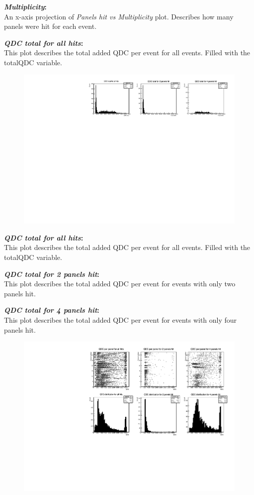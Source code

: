 \documentclass[a4paper,12pt]{article}
\begin{document}
\textbf{\emph{Multiplicity}:} \\
An x-axis projection of \emph{Panels hit vs Multiplicity} plot. Describes how many panels were hit for each event.

\textbf{\emph{QDC total for all hits}:} \\
This plot describes the total added QDC per event for all events. Filled with the totalQDC variable.

\pagebreak
\begin{figure}[h]
\centering
\includegraphics[scale=0.8]{QDCtotal.pdf}
\end{figure}

\textbf{\emph{QDC total for all hits}:} \\
This plot describes the total added QDC per event for all events. Filled with the totalQDC variable.

\textbf{\emph{QDC total for 2 panels hit}:} \\
This plot describes the total added QDC per event for events with only two panels hit.

\textbf{\emph{QDC total for 4 panels hit}:} \\
This plot describes the total added QDC per event for events with only four panels hit.

\pagebreak
\begin{figure}[h]
\centering
\includegraphics[scale=0.8]{qdcDisplay.pdf}
\end{figure}
\end{document}
